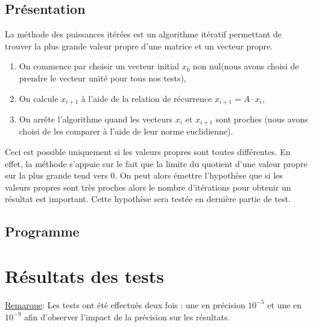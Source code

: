 \documentclass{report}
\begin{document}
      \subsection{Présentation}
      La méthode des puissances itérées est un algorithme itératif permettant de trouver la plus grande valeur propre d'une matrice et un vecteur propre. \\
      
      \begin{enumerate}
      \item{On commence par choisir un vecteur initial $x_{0}$ non nul(nous avons choisi de prendre le vecteur unité pour tous nos tests),}
      \item{On calcule $x_{i+1}$ à l'aide de la relation de récurrence $x_{i+1} = A \cdot x_i$,} 
      \item{On arrête l'algorithme quand les vecteurs $x_i$ et $x_{i+1}$ sont proches (nous avons choisi de les comparer à l'aide de leur norme euclidienne).}
      \end{enumerate}
      
      Ceci est possible uniquement si les valeurs propres sont toutes différentes. En effet, la méthode s'appuie sur le fait que la limite du quotient d'une valeur propre sur la plus grande tend vers 0. On peut alors émettre l'hypothèse que si les valeurs propres sont très proches alors le nombre d'itérations pour obtenir un résultat est important. Cette hypothèse sera testée en dernière partie de test.
      
      \subsection{Programme}
	
    \section{Résultats des tests}
      \underline{Remarque}: Les tests ont été effectués deux fois : une en précision $10^{-5}$ et une en $10^{-9}$ afin d'observer l'impact de la précision sur les résultats.
\end{document}
